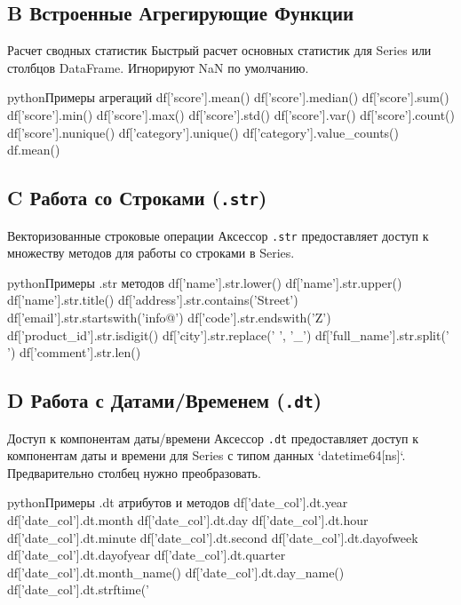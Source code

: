 \subsection{B Встроенные Агрегирующие Функции}

\begin{myblock}{Расчет сводных статистик}
    Быстрый расчет основных статистик для Series или столбцов DataFrame. Игнорируют NaN по умолчанию.
    \begin{codebox}{python}{Примеры агрегаций}
    df['score'].mean()
    df['score'].median()
    df['score'].sum()
    df['score'].min()
    df['score'].max()
    df['score'].std()
    df['score'].var()
    df['score'].count()
    df['score'].nunique()
    df['category'].unique()
    df['category'].value_counts()
    df.mean()
    \end{codebox}
\end{myblock}

\subsection{C Работа со Строками (\texttt{.str})}

\begin{myexampleblock}{Векторизованные строковые операции}
    Аксессор \texttt{.str} предоставляет доступ к множеству методов для работы со строками в Series.
    \begin{codebox}{python}{Примеры .str методов}
    df['name'].str.lower()
    df['name'].str.upper()
    df['name'].str.title()
    df['address'].str.contains('Street')
    df['email'].str.startswith('info@')
    df['code'].str.endswith('Z')
    df['product_id'].str.isdigit()
    df['city'].str.replace(' ', '_')
    df['full_name'].str.split(' ')
    df['comment'].str.len()
    \end{codebox}
\end{myexampleblock}

\subsection{D Работа с Датами/Временем (\texttt{.dt})}

\begin{myexampleblock}{Доступ к компонентам даты/времени}
    Аксессор \texttt{.dt} предоставляет доступ к компонентам даты и времени для Series с типом данных `datetime64[ns]`. Предварительно столбец нужно преобразовать.
    \begin{codebox}{python}{Примеры .dt атрибутов и методов}
    df['date_col'].dt.year
    df['date_col'].dt.month
    df['date_col'].dt.day
    df['date_col'].dt.hour
    df['date_col'].dt.minute
    df['date_col'].dt.second
    df['date_col'].dt.dayofweek
    df['date_col'].dt.dayofyear
    df['date_col'].dt.quarter
    df['date_col'].dt.month_name()
    df['date_col'].dt.day_name()
    df['date_col'].dt.strftime('%
    \end{codebox}
\end{myexampleblock}

